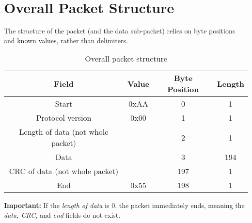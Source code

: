
\section{Overall Packet Structure} \label{section:overall}

The structure of the packet (and the data sub-packet) relies on byte positions and known values, rather than delimiters.

\begin{table}[H]
    \centering
    {
    \begin{tabular}{|c c c c|}
        \hline
        \textbf{Field} & \textbf{Value} & \textbf{Byte Position} & \textbf{Length}\\
        \hline
        \hline
        Start & 0xAA & 0 & 1\\
        Protocol version & 0x00 & 1 & 1\\
        Length of data (not whole packet) &  & 2 & 1\\
        Data &  & 3 & 194\\
        CRC of data (not whole packet) &  & 197 & 1\\
        End & 0x55 & 198 & 1\\
        \hline
    \end{tabular}
    }
    \caption{Overall packet structure}
    \label{table:overall}
\end{table}

\textbf{Important: } If the \textit{length of data} is 0, the packet immediately ends, meaning the \textit{data, CRC,} and \textit{end} fields do not exist.

